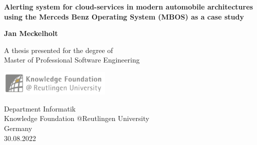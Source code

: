 \begin{titlepage}
    \begin{center}
        \vspace*{1cm}
        
        \Huge
        \textbf{Alerting system for cloud-services in modern automobile architectures using the Merceds Benz Operating System (MBOS) as a case study }
        
        \vspace{0.5cm}
        \LARGE
        
        \vspace{1.5cm}
        
        \textbf{Jan Meckelholt}
        
        \vfill
        
        A thesis presented for the degree of\\
        Master of Professional Software Engineering
        
        \vspace{0.8cm}
        
        \includegraphics[width=0.4\textwidth]{kfru}
        
        \Large
        Department Informatik\\
        Knowledge Foundation @Reutlingen University\\
        Germany\\
        30.08.2022
        
    \end{center}
\end{titlepage}